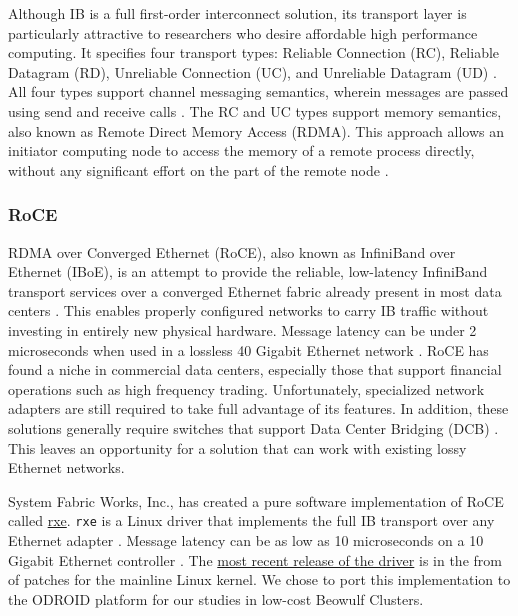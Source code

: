 \documentclass[11pt]{book}
\begin{document}
Although IB is a full first-order interconnect solution, its transport layer is
particularly attractive to researchers who desire affordable high performance computing.
It specifies four transport types: Reliable Connection (RC), Reliable Datagram (RD),
Unreliable Connection (UC), and Unreliable Datagram (UD) \cite{InfiniBandTABase-07}.  All
four types support channel messaging semantics, wherein messages are passed using send and
receive calls \cite{InfiniBandTABase-07}.  The RC and UC types support memory semantics,
also known as Remote Direct Memory Access (RDMA).  This approach allows an initiator
computing node to access the memory of a remote process directly, without any significant
effort on the part of the remote node \cite{sur-11}.

\subsubsection{RoCE}

RDMA over Converged Ethernet (RoCE), also known as InfiniBand over Ethernet (IBoE), is an
attempt to provide the reliable, low-latency InfiniBand transport services over a
converged Ethernet fabric already present in most data centers
\cite{InfiniBandTARoCE-10,roce-announce}.  This enables properly configured networks to
carry IB traffic without investing in entirely new physical hardware.  Message latency can
be under 2 microseconds when used in a lossless 40 Gigabit Ethernet network
\cite{vienne-12}.  RoCE has found a niche in commercial data centers, especially those
that support financial operations such as high frequency trading.  Unfortunately,
specialized network adapters are still required to take full advantage of its features.
In addition, these solutions generally require switches that support Data Center Bridging
(DCB) \cite{InfiniBandTARoCE-10}.  This leaves an opportunity for a solution that can work
with existing lossy Ethernet networks.

System Fabric Works, Inc., has created a pure software implementation of RoCE called
\href{http://www.systemfabricworks.com/downloads/roce}{rxe}.  \verb;rxe; is a Linux driver
that implements the full IB transport over any Ethernet adapter \cite{pearson-10}.
Message latency can be as low as 10 microseconds on a 10 Gigabit Ethernet controller
\cite{pearson-10}.  The \href{http://support.systemfabricworks.com/downloads/rxe/}{most
  recent release of the driver} is in the from of patches for the mainline Linux kernel.
We chose to port this implementation to the ODROID platform for our studies in low-cost
Beowulf Clusters.
\end{document}
